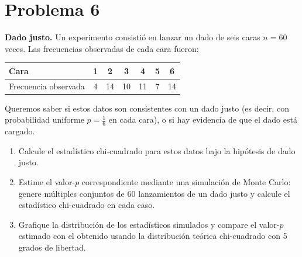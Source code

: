 \documentclass[12pt]{article}
\begin{document}
\section{Problema 6}
\textbf{Dado justo.} Un experimento consistió en lanzar un dado de seis caras $n = 60$ veces. Las frecuencias observadas de cada cara fueron:
\begin{center}
\begin{tabular}{lcccccc}
\toprule
Cara & 1 & 2 & 3 & 4 & 5 & 6 \\
\midrule
Frecuencia observada & 4 & 14 & 10 & 11 & 7 & 14 \\
\bottomrule
\end{tabular}
\end{center}
\vspace{0.3cm}
Queremos saber si estos datos son consistentes con un dado justo (es decir, con probabilidad uniforme $p = \frac{1}{6}$ en cada cara), o si hay evidencia de que el dado está cargado.
\begin{enumerate}
\item Calcule el estadístico chi-cuadrado para estos datos bajo la hipótesis de dado justo.
\item Estime el valor-$p$ correspondiente mediante una simulación de Monte Carlo: genere múltiples conjuntos de 60 lanzamientos de un dado justo y calcule el estadístico chi-cuadrado en cada caso.
\item Grafique la distribución de los estadísticos simulados y compare el valor-$p$ estimado con el obtenido usando la distribución teórica chi-cuadrado con 5 grados de libertad.
\end{enumerate}
\end{document}
